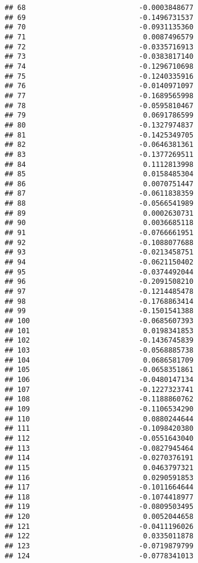 \documentclass[
]{article}
\begin{document}
\begin{verbatim}
## 68                           -0.0003848677
## 69                           -0.1496731537
## 70                           -0.0931135360
## 71                            0.0087496579
## 72                           -0.0335716913
## 73                           -0.0383817140
## 74                           -0.1296710698
## 75                           -0.1240335916
## 76                           -0.0140971097
## 77                           -0.1689565998
## 78                           -0.0595810467
## 79                            0.0691786599
## 80                           -0.1327974837
## 81                           -0.1425349705
## 82                           -0.0646381361
## 83                           -0.1377269511
## 84                            0.1112813998
## 85                            0.0158485304
## 86                            0.0070751447
## 87                           -0.0611838359
## 88                           -0.0566541989
## 89                            0.0002630731
## 90                            0.0036685118
## 91                           -0.0766661951
## 92                           -0.1088077688
## 93                           -0.0213458751
## 94                           -0.0621150402
## 95                           -0.0374492044
## 96                           -0.2091508210
## 97                           -0.1214485478
## 98                           -0.1768863414
## 99                           -0.1501541388
## 100                          -0.0685607393
## 101                           0.0198341853
## 102                          -0.1436745839
## 103                          -0.0568885738
## 104                           0.0686581709
## 105                          -0.0658351861
## 106                          -0.0480147134
## 107                          -0.1227323741
## 108                          -0.1188860762
## 109                          -0.1106534290
## 110                           0.0880244644
## 111                          -0.1098420380
## 112                          -0.0551643040
## 113                          -0.0827945464
## 114                          -0.0270376191
## 115                           0.0463797321
## 116                           0.0290591853
## 117                          -0.1011664644
## 118                          -0.1074418977
## 119                          -0.0809503495
## 120                           0.0052044658
## 121                          -0.0411196026
## 122                           0.0335011878
## 123                          -0.0719879799
## 124                          -0.0778341013

\end{verbatim}
\end{document}
